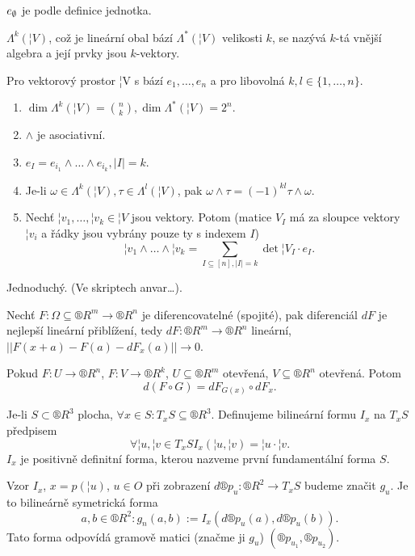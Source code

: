 \documentclass[12pt]{article}                   %
\begin{document}
    \begin{poznamka}
        $e_\emptyset$ je podle definice jednotka.

        $\Lambda^k(¦V)$, což je lineární obal bází $\Lambda^*(¦V)$ velikosti $k$, se nazývá $k$-tá vnější algebra a její prvky jsou $k$-vektory.
    \end{poznamka}

    \begin{veta}
        Pro vektorový prostor ¦V s bází $e_1, …, e_n$ a pro libovolná $k, l \in \{1, …, n\}$.
        \begin{enumerate}
            \item $\dim \Lambda^k(¦V) = \binom{n}{k}, \dim \Lambda^*(¦V) = 2^n.$
            \item $\wedge$ je asociativní.
            \item $e_I = e_{i_1} \wedge … \wedge e_{i_k}, |I|=k$.
            \item Je-li $\omega \in \Lambda^k(¦V), \tau \in \Lambda^l(¦V)$, pak $\omega \wedge \tau = (-1)^{kl}\tau \wedge \omega$.
            \item Nechť $¦v_1, …, ¦v_k \in ¦V$ jsou vektory. Potom (matice $V_I$ má za sloupce vektory $¦v_i$ a řádky jsou vybrány pouze ty s indexem $I$)
                $$¦v_1 \wedge … \wedge ¦v_k = \sum_{I \subseteq [n], |I|=k} \det ¦V_I·e_I.$$
        \end{enumerate}

        \begin{dukazin}
            Jednoduchý. (Ve skriptech anvar…).
        \end{dukazin}
    \end{veta}


    \begin{poznamka}[Označení]
        Nechť $F: \Omega \subseteq ®R^m \rightarrow ®R^n$ je diferencovatelné (spojité), pak diferenciál $dF$ je nejlepší lineární přiblížení, tedy $dF: ®R^m \rightarrow ®R^n$ lineární, $||F(x + a) - F(a) - dF_x(a)|| \rightarrow 0$.
    \end{poznamka}

    \begin{veta}
        Pokud $F: U \rightarrow ®R^n$, $F:V \rightarrow ®R^k$, $U \subseteq ®R^m$ otevřená, $V \subseteq ®R^n$ otevřená. Potom
        $$ d(F \circ G) = dF_{G(x)} \circ dF_x. $$ 
    \end{veta}

    \begin{definice}
        Je-li $S \subset ®R^3$ plocha, $\forall x \in S: T_xS \subseteq ®R^3$. Definujeme bilineární formu $I_x$ na $T_xS$ předpisem
        $$ \forall ¦u, ¦v \in T_xS I_x(¦u, ¦v) = ¦u·¦v. $$
        $I_x$ je positivně definitní forma, kterou nazveme první fundamentální forma $S$.

        Vzor $I_x$, $x = p(¦u)$, $u \in O$ při zobrazení $d®p_u: ®R^2 \rightarrow T_xS$ budeme značit $g_u$. Je to bilineárně symetrická forma
        $$ a, b \in ®R^2: g_n(a, b) := I_x(d®p_u(a), d®p_u(b)). $$
        Tato forma odpovídá gramově matici (značme ji $g_u$) $(®p_{u_1}, ®p_{u_2})$. 
    \end{definice}
\end{document}
